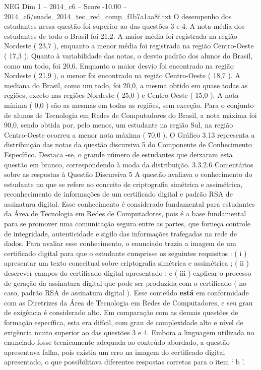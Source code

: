 \begin{textsample}{NEG Dim 1 – 2014\_c6 – Score -10.00 – 2014\_c6/enade\_2014\_tec\_red\_comp\_f1b7a1aa8f.txt}
O desempenho dos estudantes nessa questão foi superior ao das questões 3 e 4.
A nota média dos estudantes de todo o Brasil foi 21,2.
A maior média foi registrada na região Nordeste ( 23,7 ), enquanto a menor média foi registrada na região Centro-Oeste ( 17,3 ).
Quanto à variabilidade das notas, o desvio padrão dos alunos do Brasil, como um todo, foi 20,6.
Enquanto o maior desvio foi encontrado na região Nordeste ( 21,9 ), o menor foi encontrado na região Centro-Oeste ( 18,7 ).
A mediana do Brasil, como um todo, foi 20,0, a mesma obtido em quase todas as regiões, exceto nas regiões Nordeste ( 25,0 ) e Centro-Oeste ( 15,0 ).
A nota mínima ( 0,0 ) são as mesmas em todas as regiões, sem exceção.
Para o conjunto de alunos de Tecnologia em Redes de Computadores do Brasil, a nota máxima foi 90,0, sendo obtida por, pelo menos, um estudante na região Sul, na região Centro-Oeste ocorreu a menor nota máxima ( 70,0 ).
O Gráfico 3.13 representa a distribuição das notas da questão discursiva 5 do Componente de Conhecimento Específico.
Destaca -se, o grande número de estudantes que deixaram esta questão em branco, correspondendo à moda da distribuição. 3.3.2.6 Comentários sobre as respostas à Questão Discursiva 5 A questão avaliava o conhecimento do estudante no que se refere ao conceito de criptografia simétrica e assimétrica, reconhecimento de informações de um certificado digital e padrão RSA de assinatura digital.
Esse conhecimento é considerado fundamental para estudantes da Área de Tecnologia em Redes de Computadores, pois é a base fundamental para se promover uma comunicação segura entre as partes, que forneça controle de integridade, autenticidade e sigilo das informações trafegadas na rede de dados.
Para avaliar esse conhecimento, o enunciado trazia a imagem de um certificado digital para que o estudante cumprisse os seguintes requisitos : ( i ) apresentar um texto conceitual sobre criptografia simétrica e assimétrica ; ( ii ) descrever campos do certificado digital apresentado ; e ( iii ) explicar o processo de geração da assinatura digital que pode ser produzida com o certificado ( no caso, padrão RSA de assinatura digital ).
Esse conteúdo \textbf{está} em conformidade com as Diretrizes da Área de Tecnologia em Redes de Computadores, e seu grau de exigência é considerado alto.
Em comparação com as demais questões de formação específica, esta era difícil, com grau de complexidade alto e nível de exigência muito superior ao das questões 3 e 4.
Embora a linguagem utilizada no enunciado fosse tecnicamente adequada ao conteúdo abordado, a questão apresentava falha, pois existia um erro na imagem do certificado digital apresentado, o que possibilitava diferentes respostas corretas para o item ‘ b ’.

\end{textsample}
